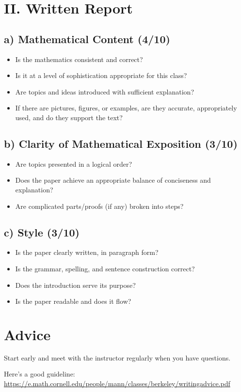 \documentclass[12pt]{amsart}
\begin{document}
\section*{II. Written Report}

\subsection*{a) Mathematical Content (4/10)}
\begin{itemize}
	\item Is the mathematics consistent and correct?
	\item Is it at a level of sophistication appropriate for this class?
	\item Are topics and ideas introduced with sufficient explanation?
	\item If there are pictures, figures, or examples, are they accurate, appropriately used, and do they support the text?
\end{itemize}

\subsection*{b) Clarity of Mathematical Exposition (3/10)}
\begin{itemize}
	\item Are topics presented in a logical order?
	\item Does the paper achieve an appropriate balance of conciseness and explanation?
	\item Are complicated parts/proofs (if any) broken into steps?
\end{itemize}

\subsection*{c) Style (3/10)}
\begin{itemize}
	\item Is the paper clearly written, in paragraph form?
	\item Is the grammar, spelling, and sentence construction correct?
	\item Does the introduction serve its purpose?
	\item Is the paper readable and does it flow?
\end{itemize}


\section{Advice}
Start early and meet with the instructor regularly when you have questions.



Here's a good guideline:
\url{https://e.math.cornell.edu/people/mann/classes/berkeley/writingadvice.pdf}


%
%
\end{document}
